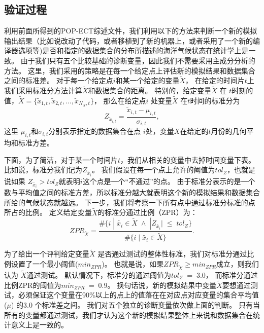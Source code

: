 \subsection{验证过程}
 
利用前面所得到的POP-ECT综述文件，我们利用以下的方法来判断一个新的模拟输出结果（比如说改动了代码，或者移植到了新的机器上，或者采用了一个新的编译器选项等)是否和指定的数据集合的分布所描述的海洋气候状态在统计学上是一致。 
由于我们只有五个比较基础的诊断变量，因此我们不需要采用主成分分析的方法。 
这里，我们采用的策略是在每一个给定点上评估新的模拟结果和数据集合之间的标准差。
对于每一个给定点$i$和某一个给定的变量$\tilde{{X}}$， 在给定的时间片$t$上我们采用标准分方法计算$\tilde{{X}}$和数据集合的距离。 
特别的，给定变量$\tilde{{X}}$ 在 $t$时刻的值，$\tilde{{X}} = \{ \tilde{x}_{1,t}, \tilde{x}_{2,t}, \dots, \tilde{x}_{N_X,t}\}$， 那么在给定点$i$ 处变量$\tilde{{X}}$ 在$t$时间的标准分为
\begin{equation*}
Z_{\tilde{x}_{i,t}}=  \frac{\tilde{x}_{i,t} -\mu_{i,t}}{\sigma_{i,t}},
\end{equation*}
这里 $\mu_{i,t}$和$\sigma_{i,t}$分别表示指定的数据集合在点 $i$处，变量$X$在给定的$t$月份的几何平均和标准方差。  

 
下面，为了简洁，对于某一个时间片$t$，我们从相关的变量中去掉时间变量下表。比如说，标准分我们记为$Z_{\tilde{x_i}}$。 
我们假设在每一个点上允许的阈值为$tol_{Z}$，也就是说如果 $Z_{\tilde{x_i}} > tol_{Z}$就表明$i$这个点是一个“不通过”的点。 
由于标准分表示的是一个数与平均值之间的标准方差，所以标准分越大就表明这个新的模拟结果和数据集合所给的气候状态就越远。 
下一步，我们将考察一下所有点中通过标准分标准的点所占的比例。 定义给定变量$\tilde{X}$的标准分通过比例（ZPR）为：
\begin{equation}\label{e:zpr}
ZPR_{\tilde{X}} = \frac{ \#\{i \;|\; \tilde{x_i} \in \tilde{X} \; \land \; |Z_{\tilde{x_i}}| \; \leq \; tol_{Z}\} }{\#\{i \;|\; \tilde{x_i} \in \tilde{X} \} }.
\end{equation}
 
为了给出一个评判给定变量$\tilde{X}$ 是否通过测试的整体性标准，我们对标准分通过比例设置了一个最小阈值($min_{ZPR}$)。 
也就是说，如果$ZPR_{\tilde{X}} \geq min_{ZPR}$成立，则我们认为 $\tilde{X}$通过测试。
默认情况下，标准分的通过阈值为$tol_{Z} \; = \; 3.0$， 而标准分通过比例ZPR的阈值为$min_{ZPR} \; = \; 0.9$。 
换句话说，新的模拟结果中变量$\tilde{X}$要想通过测试，必须保证这个变量在90$\%$以上的点上的值落在在对应点对应变量的集合平均值($\mu$) 的$3.0$ 个标准差之间。
我们对五个独立的诊断变量依次做上面的判断。 
只有当所有的变量都通过测试，我们才认为这个新的模拟结果整体上来说和数据集合在统计意义上是一致的。


